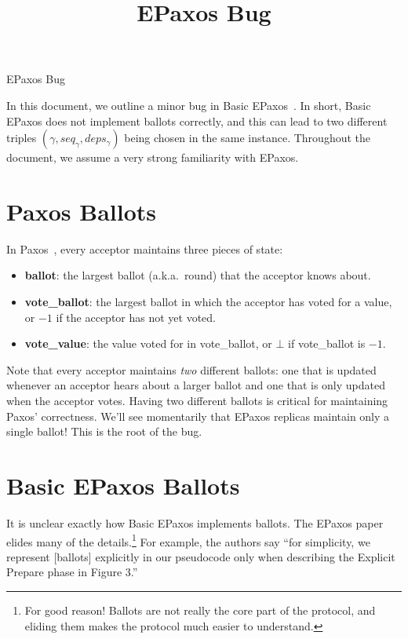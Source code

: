 \documentclass{mwhittaker}
\title{EPaxos Bug}
\begin{document}
\begin{center}
  \Large EPaxos Bug
\end{center}

In this document, we outline a minor bug in Basic EPaxos~\cite{moraru2013there,
moraru2013proof}. In short, Basic EPaxos does not implement ballots correctly,
and this can lead to two different triples $(\gamma, seq_\gamma, deps_\gamma)$
being chosen in the same instance. Throughout the document, we assume a very
strong familiarity with EPaxos.

\section{Paxos Ballots}
In Paxos~\cite{lamport1998part}, every acceptor maintains three pieces of
state:
\newcommand{\voteBallot}{vote\_ballot}
\newcommand{\voteValue}{vote\_value}
\begin{itemize}
  \item \textbf{ballot}:
    the largest ballot (a.k.a.\ round) that the acceptor knows about.

  \item \textbf{\voteBallot{}}:
    the largest ballot in which the acceptor has voted for a value, or $-1$ if
    the acceptor has not yet voted.

  \item \textbf{\voteValue{}}:
    the value voted for in \voteBallot{}, or $\bot$ if vote\_ballot is $-1$.
\end{itemize}
Note that every acceptor maintains \emph{two} different ballots: one that is
updated whenever an acceptor hears about a larger ballot and one that is only
updated when the acceptor votes. Having two different ballots is critical for
maintaining Paxos' correctness. We'll see momentarily that EPaxos replicas
maintain only a single ballot! This is the root of the bug.

\section{Basic EPaxos Ballots}
It is unclear exactly how Basic EPaxos implements ballots. The EPaxos
paper~\cite{moraru2013proof} elides many of the details.\footnote{For good
reason!  Ballots are not really the core part of the protocol, and eliding them
makes the protocol much easier to understand.} For example, the authors say
``for simplicity, we represent [ballots] explicitly in our pseudocode only when
describing the Explicit Prepare phase in Figure 3.''
\end{document}
